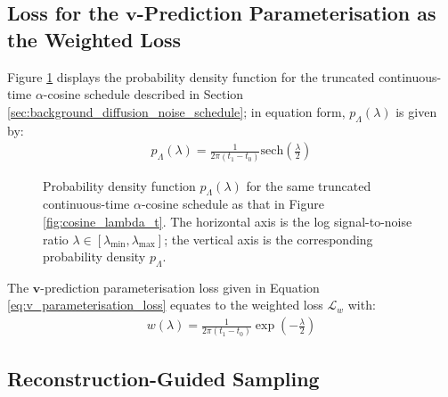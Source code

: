 \documentclass[ oneside,%
                    author={George Herbert},
                    degree={MSci},
                     title={Video Diffusion Models for Climate Simulations},
                  subtitle={}]{dissertation}
\begin{document}
\subsection{Loss for the $\mathbf{v}$-Prediction Parameterisation as the Weighted Loss}
\label{sec:background_diffusion_v_weighted_loss}

Figure \ref{fig:p_lambda} displays the probability density function for the truncated continuous-time $\alpha$-cosine schedule described in Section \ref{sec:background_diffusion_noise_schedule}; in equation form, $p_\Lambda(\lambda)$ is given by:
\begin{align}
      p_\Lambda(\lambda)=\frac{1}{2\pi(t_1-t_0)}\mathrm{sech}\left(\frac{\lambda}{2}\right)
\end{align}
\begin{figure}[htbp]
      \centering
      \caption{Probability density function $p_\Lambda(\lambda)$ for the same truncated continuous-time $\alpha$-cosine schedule as that in Figure \ref{fig:cosine_lambda_t}. The horizontal axis is the log signal-to-noise ratio $\lambda\in[\lambda_{\min}, \lambda_{\max}]$; the vertical axis is the corresponding probability density $p_\Lambda$.}
      \label{fig:p_lambda}
\end{figure}

The $\mathbf{v}$-prediction parameterisation loss given in Equation \ref{eq:v_parameterisation_loss} equates to the weighted loss $\mathcal{L}_w$ with:
\begin{align}
      w(\lambda)=\frac{1}{2\pi(t_1-t_0)}\exp\left(-\frac{\lambda}{2}\right)
\end{align}


\subsection{Reconstruction-Guided Sampling}
\label{sec:background_diffusion_reconstruction_guided_sampling}
\end{document}
